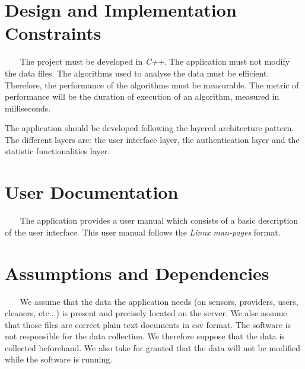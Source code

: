 \documentclass{report}
\begin{document}
\section{Design and Implementation Constraints} ~~~
The project must be developed in \textit{C++}. The application must not modify
the data files. The algorithms used to analyse the data must be efficient.
Therefore, the performance of the algorithms must be measurable. The metric of
performance will be the duration of execution of an algorithm, measured in
milliseconds.

The application should be developed following the layered architecture pattern.
The different layers are: the user interface layer, the authentication layer
and the statistic functionalities layer.


\section{User Documentation} ~~~
The application provides a user manual which consists of a basic description of
the user interface. This user manual follows the \textit{Linux man-pages} format.


\section{Assumptions and Dependencies} ~~~
We assume that the data the application needs (on sensors, providers, users,
cleaners, etc...) is present and precisely located on the server. We alse assume
that those files are correct plain text documents in csv format. The software is
not responsible for the data collection. We therefore suppose that the data is
collected beforehand. We also take for granted that the data will not be
modified while the software is running.
\end{document}
